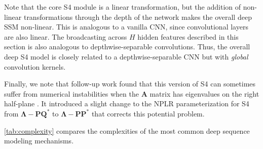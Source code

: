 Note that the core S4 module is a linear transformation, but the addition of non-linear transformations through the depth of the network makes the overall deep SSM non-linear.
This is analogous to a vanilla CNN, since convolutional layers are also linear.
The broadcasting across \( H \) hidden features described in this section is also analogous to depthwise-separable convolutions.
Thus, the overall deep S4 model is closely related to a depthwise-separable CNN but with \emph{global} convolution kernels.

Finally, we note that follow-up work found that this version of S4 can sometimes suffer from numerical instabilities when the \( \bm{A} \) matrix has eigenvalues on the right half-plane \citep{goel2022sashimi}.
It introduced a slight change to the NPLR parameterization for S4 from \( \bm{\Lambda} - \bm{P}\bm{Q}^* \) to \( \bm{\Lambda} - \bm{P}\bm{P}^* \) that corrects this potential problem.

\cref{tab:complexity} compares the complexities of the most common deep sequence modeling mechanisms.
